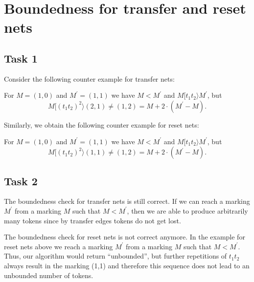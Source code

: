 \section{Boundedness for transfer and reset nets}
\subsection{Task 1}
Consider the following counter example for transfer nets:
\begin{center}\end{center}
For $M = (1,0)$ and $M^\prime = (1,1)$ we have $M < M^\prime$ and $M [t_1 t_2 \rangle M^\prime$, but
\[
M [(t_1 t_2)^2 \rangle (2,1) \neq (1,2) = M + 2 \cdot  (M^\prime - M).
\]

Similarly, we obtain the following counter example for reset nets:
\begin{center}\end{center}
For $M = (1,0)$ and $M^\prime = (1,1)$ we have $M < M^\prime$ and $M [t_1 t_2 \rangle M^\prime$, but
\[
M [(t_1 t_2)^2 \rangle (1,1) \neq (1,2) = M + 2 \cdot  (M^\prime - M).
\]

\subsection{Task 2}
The boundedness check for transfer nets is still correct. If we can reach a marking $M^\prime$ from a marking $M$ such that $M < M^\prime$, then we are able to produce arbitrarily many tokens since by transfer edges tokens do not get lost.

The boundedness check for reset nets is not correct anymore. In the example for reset nets above we reach a marking $M^\prime$ from a marking $M$ such that $M < M^\prime$. Thus, our algorithm would return ``unbounded'', but further repetitions of $t_1 t_2$ always result in the marking (1,1) and therefore this sequence does not lead to an unbounded number of tokens. 